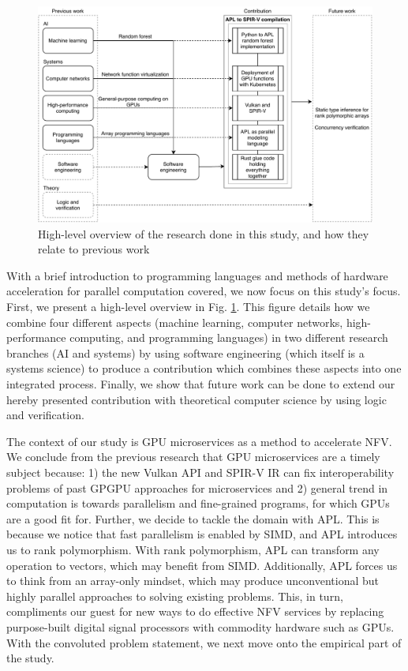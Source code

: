 \documentclass{IEEEtran}
\begin{document}
\begin{figure}
  \centering
  \includegraphics[width=\columnwidth*2]{overview.pdf}
  \caption{High-level overview of the research done in this study, and how they relate to previous work}
  \label{fig:ov}
\end{figure}

With a brief introduction to programming languages and methods of hardware acceleration for parallel computation covered, we now focus on this study's focus. First, we present a high-level overview in Fig. \ref{fig:ov}. This figure details how we combine four different aspects (machine learning, computer networks, high-performance computing, and programming languages) in two different research branches (AI and systems) by using software engineering (which itself is a systems science) to produce a contribution which combines these aspects into one integrated process. Finally, we show that future work can be done to extend our hereby presented contribution with theoretical computer science by using logic and verification.

The context of our study is GPU microservices as a method to accelerate \gls{NFV}. We conclude from the previous research that GPU microservices are a timely subject because: 1) the new Vulkan API and SPIR-V IR can fix interoperability problems of past GPGPU approaches for microservices and 2) general trend in computation is towards parallelism and fine-grained programs, for which GPUs are a good fit for. Further, we decide to tackle the domain with APL. This is because we notice that fast parallelism is enabled by \gls{SIMD}, and APL introduces us to rank polymorphism. With rank polymorphism, APL can transform any operation to vectors, which may benefit from \gls{SIMD}. Additionally, APL forces us to think from an array-only mindset, which may produce unconventional but highly parallel approaches to solving existing problems. This, in turn, compliments our guest for new ways to do effective \gls{NFV} services by replacing purpose-built digital signal processors with commodity hardware such as GPUs. With the convoluted problem statement, we next move onto the empirical part of the study.
\end{document}
